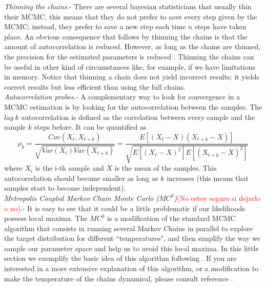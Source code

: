 \documentclass[onecolumn,           %
               showpacs,            %
               preprintnumbers,     %
               aps,                 %
               prl,          	    %
               letterpaper,             %
               superscriptaddress,      %
               nofootinbib,         %
               tightenlines,        %
               floats,floatfix      %
               ,usenatbib,
               ]{revtex4-1}
\begin{document}
 \textit{Thinning the chains}.- There are several bayesian statisticians that usually thin their MCMC, this means that they do not prefer to save every step given by the MCMC; instead, they prefer to save a new step each time $n$ steps have taken place. An obvious consequence that follows by thinning the chains is that the amount of autocorrelation is reduced. However, as long as the chains are thinned, the precision for the estimated parameters is reduced \cite{thin}. Thinning the chains can be useful in other kind of circumstances like, for example, if we have limitations in memory. Notice that thinning a chain does not yield incorrect results; it yields correct results but less efficient than using the full chains.       
\\

\textit{Autocorrelation probes}.- A complementary way to look for convergence in a MCMC estimation is by looking for the autocorrelation between the samples. The $lag\ k$ autocorrelation is defined as the correlation between every sample and the sample $k$ steps before. It can be quantified as \cite{autocor}
\begin{equation}
\rho_k=\frac{Cov(X_t,X_{t+k})}{\sqrt{Var(X_t)Var(X_{t+k})}}=\frac{E[(X_t-X)(X_{t+k}-X)]}{\sqrt{E[(X_t-X)^2]E[(X_{t+k}-X)^2]}}
\end{equation}
where $X_i$ is the i-th sample and $X$ is the mean of the samples. This autocorrelation should become smaller as long as $k$ increases (this means that samples start to become independent).\\

\textit{Metropolis Coupled Markov Chain Monte Carlo ($MC^3$)}\textcolor{red}{(No estoy seguro si dejarlo o no)}.- It is easy to see that it could be a little problematic if our likelihoods possess local maxima. The $MC^3$ is a modification of the standard MCMC algorithm that consists in running several Markov Chains in parallel to explore the target distribution for different  ``temperatures", and then simplify the way we sample our parameter space and help us to avoid this local maxima. In this little section we exemplify the basic idea of this algorithm following \cite{mcmcmc}. If you are interested in a more extensive explanation of this algorithm, or a modification to make the temperature of the chains dynamical, please consult reference \cite{mcmcmc}.
\end{document}
